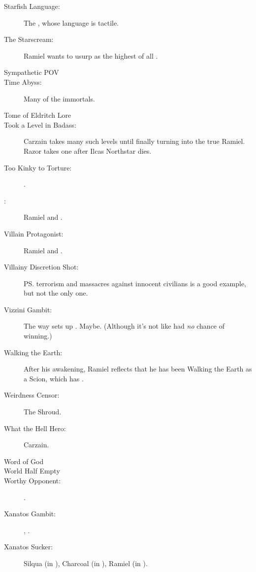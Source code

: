 \begin{flushleft}
\begin{description}
  \item[Starfish Language:] 
    The \banes, whose language is tactile. 
  \item[The Starscream:] 
    Ramiel wants to usurp \Azraid{} as the highest of all \resphain. 
  \item[Sympathetic POV]
  \item[Time Abyss:] Many of the immortals. 
  \item[Tome of Eldritch Lore]
  \item[Took a Level in Badass:] 
    \subitem Carzain takes many such levels until finally turning into the true Ramiel. 
    \subitem Razor takes one after Ilcas Northstar dies.
  \item[Too Kinky to Torture:] \Nexagglachel.
  \item[\Ubermensch:] Ramiel and \Ishnaruchaefir.
  \item[Villain Protagonist:] Ramiel and \Ishnaruchaefir. 
  \item[Villainy Discretion Shot:] 
    \ps{\Ishnaruchaefir} terrorism and massacres against innocent civilians  is a good example, but not the only one. 
  \item[Vizzini Gambit:] 
    The way \Ishnaruchaefir{} sets up \Teshrial. 
    Maybe. 
    (Although it's not like \Teshrial{} had \emph{no} chance of winning.)
  \item[Walking the Earth:]
    After his awakening, Ramiel reflects that he has been Walking the Earth as a Scion, which has . 
  \item[Weirdness Censor:] The Shroud.
  \item[What the Hell Hero:] Carzain. 
  \item[Word of God]
  \item[World Half Empty] 
  \item[Worthy Opponent:] \Narkiza. 
  \item[Xanatos Gambit:] \Daggerrain, \Secherdamon. 
  \item[Xanatos Sucker:] 
    Silqua (in \SilquaBookEmph), 
    Charcoal (in \TwilightAngelRememberEmph), 
    Ramiel (in \SentinelsFinalBookEmph). 
\end{description}


\end{flushleft}
